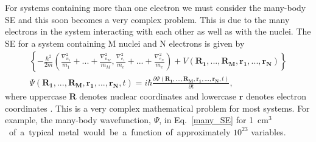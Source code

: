 \documentclass[11pt, twoside]{report}
\begin{document}
For systems containing more than one electron we must consider the many-body SE and this soon becomes a very complex problem. This is due to the many electrons in the system interacting with each other as well as with the nuclei. The SE for a system containing M nuclei and N electrons is given by
\begin{multline}  \label{many_SE}
\left\{ - \frac{\hbar^2}{2m} \left( \frac{\nabla_{n_1}^2}{m_1} + ... + \frac{\nabla_{n_M}^2}{m_M}, 
\frac{\nabla_{e_1}^2}{m_e} + ... + \frac{\nabla_{e_N}^2}{m_e} \right)
+ V \left( \boldsymbol{R_1},...,\boldsymbol{R_M}, \boldsymbol{r_1}, ..., \boldsymbol{r_N} \right)
\right\} \\
\Psi (\boldsymbol{R_1},...,\boldsymbol{R_M}, \boldsymbol{r_1}, ..., \boldsymbol{r_N}, t)
= i\hbar \frac{\partial\Psi(\boldsymbol{R_1},...,\boldsymbol{R_M}, \boldsymbol{r_1}, ..., \boldsymbol{r_N},t)}{\partial t} ,
\end{multline}
where uppercase $\boldsymbol{R}$ denotes nuclear coordinates and lowercase $\boldsymbol{r}$ denotes electron coordinates  \cite{Lesar}. This is a very complex mathematical problem for most systems. For example, the many-body wavefunction, $\Psi$, in Eq.~\ref{many_SE} for \SI{1}{cm$^3$} of a typical metal would be a function of approximately $10^{23}$ variables.
\end{document}
